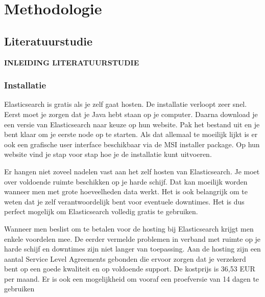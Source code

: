
\chapter{Methodologie}
\label{ch:methodologie}


\section{Literatuurstudie}

\textbf{INLEIDING LITERATUURSTUDIE}

\subsection{Installatie}

Elasticsearch is gratis als je zelf gaat hosten. De installatie verloopt zeer snel. Eerst moet je zorgen dat je Java hebt staan op je computer. Daarna download je een versie van Elasticsearch naar keuze op hun website. Pak het bestand uit en je bent klaar om je eerste node op te starten. Als dat allemaal te moeilijk lijkt is er ook een grafische user interface beschikbaar via de MSI installer package. Op hun website vind je stap voor stap hoe je de installatie kunt uitvoeren. 

Er hangen niet zoveel nadelen vast aan het zelf hosten van Elasticsearch. Je moet over voldoende ruimte beschikken op je harde schijf. Dat kan moeilijk worden wanneer men met grote hoeveelheden data werkt. Het is ook belangrijk om te weten dat je zelf verantwoordelijk bent voor eventuele downtimes. Het is dus perfect mogelijk om Elasticsearch volledig gratis te gebruiken. 

Wanneer men beslist om te betalen voor de hosting bij Elasticsearch krijgt men enkele voordelen mee. De eerder vermelde problemen in verband met ruimte op je harde schijf en downtimes zijn niet langer van toepassing.  Aan de hosting zijn een aantal Service Level Agreements gebonden die ervoor zorgen dat je verzekerd bent op een goede kwaliteit en op voldoende support. De kostprijs is 36,53 EUR per maand. Er is ook een mogelijkheid om vooraf een proefversie van 14 dagen te gebruiken 

